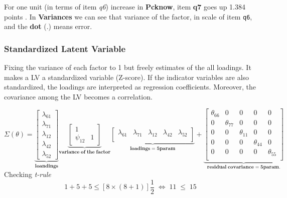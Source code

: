 \documentclass[
]{article}
\begin{document}
For one unit (in terms of item \emph{q6}) increase in \textbf{Pcknow},
item \textbf{q7} goes up 1.384 points . In \textbf{Variances} we can see
that variance of the factor, in scale of item \texttt{q6}, and the
\textbf{dot} (.) means error.

\hypertarget{standardized-latent-variable}{%
\subsubsection{Standardized Latent
Variable}\label{standardized-latent-variable}}

Fixing the variance of each factor to 1 but freely estimates of the all
loadings. It makes a LV a standardized variable (Z-score). If the
indicator variables are also standardized, the loadings are interpreted
as regression coefficients. Moreover, the covariance among the LV
becomes a correlation.

\[
\Sigma(\theta)=\underbrace{\begin{bmatrix}
\lambda_{61}     \\
\lambda_{71}     \\
\lambda_{12}     \\
\lambda_{42}     \\
\lambda_{52}     
            \end{bmatrix}
 }_{\mathbf{loandings}} \underbrace{\begin{bmatrix}
1 & \\
\psi_{12} & 1
            \end{bmatrix}
 }_{\mathbf{variance \; of \; the \;factor}} \underbrace{\begin{bmatrix}
\lambda_{61}  & \lambda_{71}  & \lambda_{12} & \lambda_{42} & \lambda_{52} \\
            \end{bmatrix}
 }_{\mathbf{loadings=5param}} + \underbrace{\begin{bmatrix}
\theta_{66} & 0 & 0 & 0 & 0  \\
0 & \theta_{77} & 0 & 0 & 0   \\
0 & 0 & \theta_{11} & 0 & 0    \\
0 & 0 & 0 & \theta_{44} & 0    \\
0 & 0 & 0 & 0 & \theta_{55}    \\
            \end{bmatrix}
            }_{\mathbf{residual \; covariance=5param.}}
\] Checking \emph{t-rule} \[
1+5+5 \leq [8\times(8+1)]\frac{1}{2} \; \Leftrightarrow \;11 \; \leq \;15
\]
\end{document}

